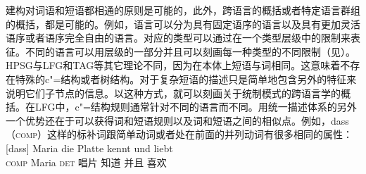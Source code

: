 建构对词语和短语都相通的原则是可能的，此外，跨语言的概括或者特定语言群组的概括，都是可能的。例如，语言可以分为具有固定语序的语言以及具有更加灵活语序或者语序完全自由的语言。对应的类型可以通过在一个类型层级中的限制来表征。不同的语言可以用层级的一部分并且可以刻画每一种类型的不同限制（见\citealp[\S~9.2]{AW98a}）。HPSG\indexhpsgc 与LFG\indexlfgc 和TAG\indextagc 等其它理论不同，因为在本体上短语与词相同。这意味着不存在特殊的c"=结构或者树结构。对于复杂短语的描述只是简单地包含另外的特征来说明它们子节点的信息。以这种方式，就可以刻画关于统制模式的跨语言学的概括。在LFG中，c"=结构规则通常针对不同的语言而不同。用统一描述体系的另外一个优势还在于可以获得词和短语规则以及词和短语之间的相似点。例如，dass （\textsc{comp}）这样的标补词跟简单动词或者处在前面的并列动词有很多相同的属性：
\eal
\ex
\gll {}[dass] Maria die Platte kennt und liebt\\
	 {}\spacebr{}\textsc{comp} Maria \textsc{det} 唱片 知道 并且 喜欢\\
